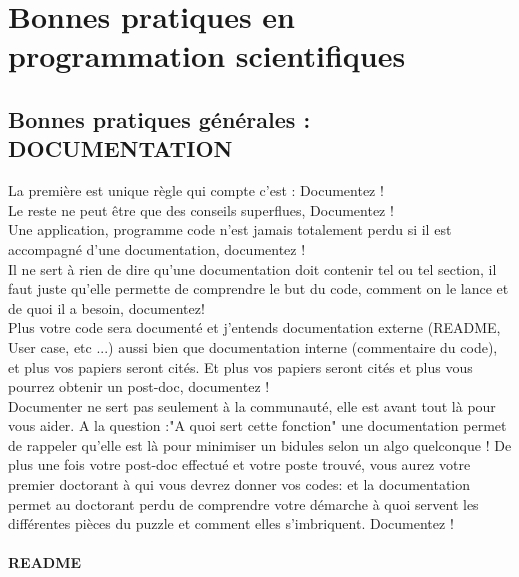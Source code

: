 \section{Bonnes pratiques en programmation scientifiques}

\subsection{Bonnes pratiques générales : DOCUMENTATION}

La première est unique règle qui compte c'est : Documentez ! \\

Le reste ne peut être que des conseils superflues, Documentez ! \\

Une application, programme code n'est jamais totalement perdu si il est accompagné d'une documentation,
 documentez !\\

Il ne sert à rien de dire qu'une documentation doit contenir tel ou tel section, il faut juste 
qu'elle permette de comprendre le but du code, comment on le lance et de quoi il a besoin, documentez! \\

Plus votre code sera documenté et j'entends documentation externe (README, User case, etc ...) aussi 
bien que documentation interne (commentaire du code), et plus vos papiers seront cités. 
Et plus vos papiers seront cités et plus vous pourrez obtenir un post-doc, documentez ! \\

Documenter ne sert pas seulement à la communauté, elle est avant tout là pour vous aider. 
A la question :"A quoi sert cette fonction" une documentation permet de rappeler qu'elle
 est là pour minimiser un bidules selon un algo quelconque ! De plus une fois votre post-doc
 effectué et votre poste trouvé, vous aurez votre premier doctorant à qui vous devrez donner vos codes:
 et la documentation permet au doctorant perdu de comprendre votre démarche à quoi servent 
les différentes pièces du puzzle et comment elles s'imbriquent. Documentez !\\

\paragraph{README}

